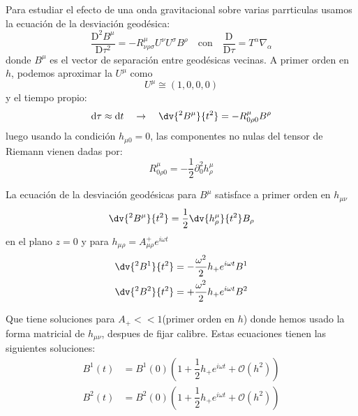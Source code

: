 \documentclass[../main]{subfiles}
\begin{document}
\begin{adjustwidth}{0pt}{-100pt}
Para estudiar el efecto de una onda gravitacional sobre varias parrticulas usamos la ecuación de la desviación geodésica:
\begin{equation}
    \dfrac{\mathrm{D}^2 B^{\mu}}{\mathrm{D}\tau^2}=-R^{\mu}_{\nu\rho\sigma}U^{\nu}U^{\sigma}B^{\rho} \quad \text{con} \quad \dfrac{\mathrm{D}}{\mathrm{D}\tau}=T^{\alpha}\nabla_{\alpha}
\end{equation}
donde $B^{\mu}$ es el vector de separación entre geodésicas vecinas. A primer orden en $h$, podemos aproximar la $U^{\mu}$ como 
\begin{equation}
    U^{\mu} \cong (1, 0, 0, 0)
\end{equation}
y el tiempo propio:
\begin{equation}
    \mathrm{d}\tau\approx \mathrm{d}t \quad \rightarrow \quad \dv{^2 B^{\mu}}{t^2}=-R^{\mu}_{0\rho 0}B^{\rho}
\end{equation}
luego usando la condición $h_{\mu 0}=0$, las componentes no nulas del tensor de Riemann vienen dadas por:
\begin{equation}
    R^{\mu}_{0\rho 0}=-\dfrac{1}{2}\partial^2_0 h^{\mu}_{\rho}
\end{equation}

La ecuación de la desviación geodésicas para $B^{\mu}$ satisface a primer orden en $h_{\mu\nu}$ 
\begin{equation}
    \dv{^2 B^{\mu}}{t^2}=\dfrac{1}{2}\dv{h^{\mu}_{\rho}}{t^2}B_{\rho}
\end{equation}
en el plano $z=0$ y para $h_{\mu\rho}=A^+_{\mu\rho}e^{i\omega t}$ 
\begin{equation}
    \begin{split}
        \dv{^2 B^1}{t^2}&=-\dfrac{\omega^2}{2}h_+ e^{i \omega t}B^1 \\ 
        \dv{^2 B^2}{t^2}&=+\dfrac{\omega^2}{2}h_+ e^{i \omega t}B^2
    \end{split}
\end{equation}

Que tiene soluciones para $A_+ << 1$(primer orden en $h$) donde hemos usado la forma matricial de $h_{\mu\nu}$, despues de fijar calibre. Estas ecuaciones tienen las siguientes soluciones:
\begin{equation}
    \begin{split}
        B^1(t)&=B^1(0)\left(1+\dfrac{1}{2}h_+ e^{i\omega t}+\mathcal{O}(h^2)\right)\\
        B^2(t)&=B^2(0)\left(1+\dfrac{1}{2}h_+ e^{i\omega t}+\mathcal{O}(h^2)\right)
    \end{split}
\end{equation}


\end{adjustwidth}
\end{document}

